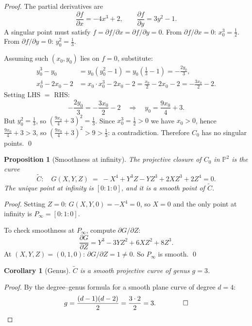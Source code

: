 \documentclass[12pt, a4paper]{article}
\newtheorem{corollary}[theorem]{Corollary}
\newtheorem{proposition}[theorem]{Proposition}
\theoremstyle{definition}
\newcommand{\Proj}{\mathbb{P}}
\begin{document}
\begin{proof}
  The partial derivatives are
  \[
    \frac{\partial f}{\partial x} = -4x^3 + 2, \qquad
    \frac{\partial f}{\partial y} = 3y^2 - 1.
  \]
  A singular point must satisfy $f = \partial f/\partial x = \partial f/\partial y = 0$.
  From $\partial f/\partial x = 0$: $x_0^3 = \tfrac{1}{2}$.
  From $\partial f/\partial y = 0$: $y_0^2 = \tfrac{1}{3}$.

  Assuming such $(x_0, y_0)$ lies on $f = 0$, substitute:
  \begin{align*}
    y_0^3 - y_0 &= y_0(y_0^2 - 1) = y_0\!\left(\tfrac{1}{3} - 1\right) = -\tfrac{2y_0}{3}, \\
    x_0^4 - 2x_0 - 2 &= x_0 \cdot x_0^3 - 2x_0 - 2 = \tfrac{x_0}{2} - 2x_0 - 2 = -\tfrac{3x_0}{2} - 2.
  \end{align*}
  Setting LHS $=$ RHS:
  \[
    -\frac{2y_0}{3} = -\frac{3x_0}{2} - 2
    \quad\Longrightarrow\quad
    y_0 = \frac{9x_0}{4} + 3.
  \]
  But $y_0^2 = \tfrac{1}{3}$, so $\left(\tfrac{9x_0}{4} + 3\right)^2 = \tfrac{1}{3}$.
  Since $x_0^3 = \tfrac{1}{2} > 0$ we have $x_0 > 0$, hence
  $\tfrac{9x_0}{4} + 3 > 3$, so $\left(\tfrac{9x_0}{4}+3\right)^2 > 9 > \tfrac{1}{3}$:
  a contradiction. Therefore $C_0$ has no singular points. \qed
\end{proof}

\begin{proposition}[Smoothness at infinity]\label{prop:smooth_inf}
  The projective closure of $C_0$ in $\Proj^2$ is the curve
  \[
    \widetilde{C}: \quad G(X,Y,Z) \;=\; -X^4 + Y^3Z - YZ^3 + 2XZ^3 + 2Z^4 = 0.
  \]
  The unique point at infinity is $[0:1:0]$, and it is a smooth point of $\widetilde{C}$.
\end{proposition}

\begin{proof}
  Setting $Z=0$: $G(X,Y,0) = -X^4 = 0$, so $X=0$ and the only point at infinity
  is $P_\infty = [0:1:0]$.

  To check smoothness at $P_\infty$, compute $\partial G/\partial Z$:
  \[
    \frac{\partial G}{\partial Z} = Y^3 - 3YZ^2 + 6XZ^2 + 8Z^3.
  \]
  At $(X,Y,Z) = (0,1,0)$: $\partial G/\partial Z = 1 \neq 0$.
  So $P_\infty$ is smooth. \qed
\end{proof}

\begin{corollary}[Genus]\label{cor:genus}
  $\widetilde{C}$ is a smooth projective curve of genus $g = 3$.
\end{corollary}

\begin{proof}
  By the degree--genus formula for a smooth plane curve of degree $d = 4$:
  \[
    g = \frac{(d-1)(d-2)}{2} = \frac{3 \cdot 2}{2} = 3. \qquad\qed
  \]
\end{proof}
\end{document}
